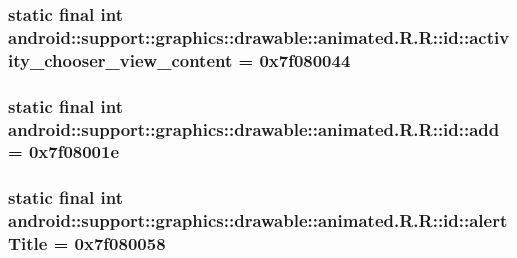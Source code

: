 \hypertarget{classandroid_1_1support_1_1graphics_1_1drawable_1_1animated_1_1_r_1_1id_b26a6ea3117ccb2fafc0329523314cdb}{
\subsubsection[{activity\_\-chooser\_\-view\_\-content}]{\setlength{\rightskip}{0pt plus 5cm}static final int android::support::graphics::drawable::animated.R.R::id::activity\_\-chooser\_\-view\_\-content = 0x7f080044}}
\label{classandroid_1_1support_1_1graphics_1_1drawable_1_1animated_1_1_r_1_1id_b26a6ea3117ccb2fafc0329523314cdb}


\hypertarget{classandroid_1_1support_1_1graphics_1_1drawable_1_1animated_1_1_r_1_1id_26bc6896c32f8f3b8766a1ded1d4c771}{
\subsubsection[{add}]{\setlength{\rightskip}{0pt plus 5cm}static final int android::support::graphics::drawable::animated.R.R::id::add = 0x7f08001e}}
\label{classandroid_1_1support_1_1graphics_1_1drawable_1_1animated_1_1_r_1_1id_26bc6896c32f8f3b8766a1ded1d4c771}


\hypertarget{classandroid_1_1support_1_1graphics_1_1drawable_1_1animated_1_1_r_1_1id_c6e56ec9f15a2d2c8be141268257b360}{
\subsubsection[{alertTitle}]{\setlength{\rightskip}{0pt plus 5cm}static final int android::support::graphics::drawable::animated.R.R::id::alertTitle = 0x7f080058}}
\label{classandroid_1_1support_1_1graphics_1_1drawable_1_1animated_1_1_r_1_1id_c6e56ec9f15a2d2c8be141268257b360}


